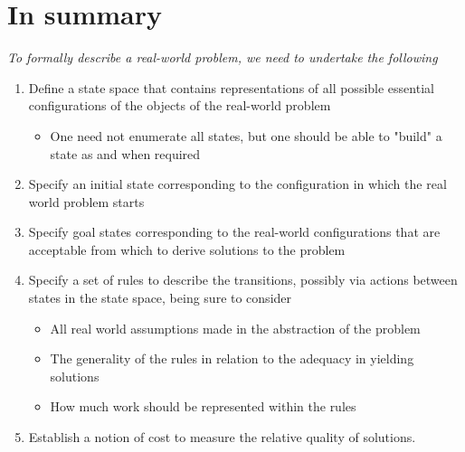 \documentclass{article}[18pt]
\begin{document}
\section{In summary}
\textit{To formally describe a real-world problem, we need to undertake the following}
\begin{enumerate}
	\item Define a state space that contains representations of all possible essential configurations of the objects of the real-world problem
	\begin{itemize}
		\item One need not enumerate all states, but one should be able to "build" a state as and when required
	\end{itemize}
	\item Specify an initial state corresponding to the configuration in which the real world problem starts
	\item Specify goal states corresponding to the real-world configurations that are acceptable from which to derive solutions to the problem
	\item Specify a set of rules to describe the transitions, possibly via actions between states in the state space, being sure to consider
	\begin{itemize}
		\item All real world assumptions made in the abstraction of the problem
		\item The generality of the rules in relation to the adequacy in yielding solutions
		\item How much work should be represented within the rules
	\end{itemize}
	\item Establish a notion of cost to measure the relative quality of solutions.
\end{enumerate}
\end{document}
